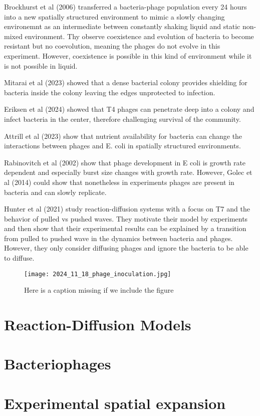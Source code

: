 Brockhurst et al (2006) transferred a bacteria-phage population every 24 hours into a new spatially structured environment to mimic a slowly changing environemnt as an intermediate between constantly shaking liquid and static non-mixed environment. Thy observe coexistence and evolution of bacteria to become resistant but no coevolution, meaning the phages do not evolve in this experiment. However, coexistence is possible in this kind of environment while it is not possible in liquid.

Mitarai et al (2023) showed that a dense bacterial colony provides shielding for bacteria inside the colony leaving the edges unprotected to infection.

Eriksen et al (2024) showed that T4 phages can penetrate deep into a colony and infect bacteria in the center, therefore challenging survival of the community.

Attrill et al (2023) show that nutrient availability for bacteria can change the interactions between phages and E. coli in spatially structured environments. 

Rabinovitch et al (2002) show that phage development in E coli is growth rate dependent and especially burst size changes with growth rate.
However, Golec et al (2014) could show that nonetheless in experiments phages are present in bacteria and can slowly replicate.

Hunter et al (2021) study reaction-diffusion systems with a focus on T7 and the behavior of pulled vs pushed waves. They motivate their model by experiments and then show that their experimental results can be explained by a transition from pulled to pushed wave in the dynamics between bacteria and phages. However, they only consider diffusing phages and ignore the bacteria to be able to diffuse.

\begin{figure}
\texttt{[image: 2024\_11\_18\_phage\_inoculation.jpg]}
\caption{Here is a caption missing if we include the figure}
\end{figure}

\section{Reaction-Diffusion Models}

\section{Bacteriophages}

\section{Experimental spatial expansion}